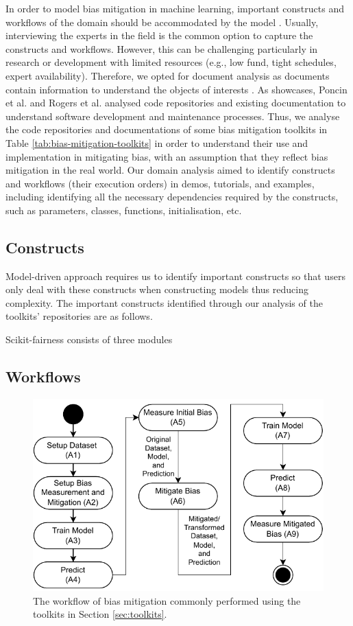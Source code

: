 \documentclass[sigconf,review]{acmart}
\begin{document}
In order to model bias mitigation in machine learning, important constructs and workflows of the domain should be accommodated by the model \cite{volter2013model}. Usually, interviewing the experts in the field is the common option to capture the constructs and workflows. However, this can be challenging particularly in research or development with limited resources (e.g., low fund, tight schedules, expert availability). Therefore, we opted for document analysis as documents contain information to understand the objects of interests \cite{bowen2009document}. As showcases, Poncin et al. \cite{poncin2011process} and Rogers et al. \cite{rogers2015using} analysed code repositories and existing documentation to understand software development and maintenance processes. Thus, we analyse the code repositories and documentations of some bias mitigation toolkits in Table \ref{tab:bias-mitigation-toolkits} in order to understand their use and implementation in mitigating bias, with an assumption that they reflect bias mitigation in the real world. Our domain analysis aimed to identify constructs and workflows (their execution orders) in demos, tutorials, and examples, including identifying all the necessary dependencies required by the constructs, such as parameters, classes, functions, initialisation, etc.

\subsection{Constructs}
\label{sec:constructs}
Model-driven approach requires us to identify important constructs so that users only deal with these constructs when constructing models thus reducing complexity. The important constructs identified through our analysis of the toolkits' repositories are as follows. 

Scikit-fairness consists of three modules

\subsection{Workflows}
\label{sec:workflows}

\begin{figure}
	\includegraphics[width=\linewidth]{figures/workflow}
	\caption{The workflow of bias mitigation commonly performed using the toolkits in Section \ref{sec:toolkits}.}
	\label{fig:workflow}
\end{figure}
\end{document}

